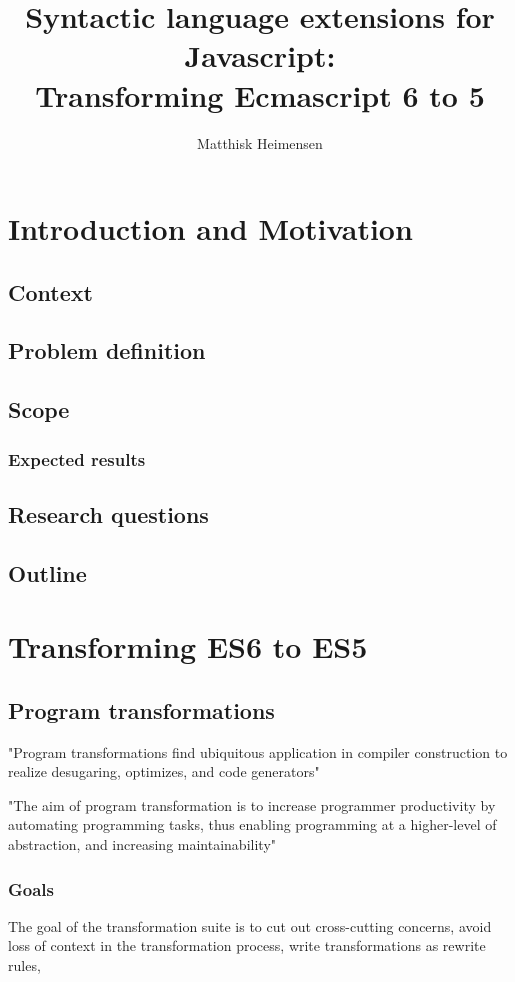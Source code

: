\documentclass[10pt,a4paper]{article}
\title{%
	Syntactic language extensions for Javascript: \\
	\large Transforming Ecmascript 6 to 5}
\author{Matthisk Heimensen}
\begin{document}
	\maketitle
	\tableofcontents

\chapter{Introduction and Motivation}

\section{Context}
\section{Problem definition}
\section{Scope}
\subsection{Expected results}
\section{Research questions}
\section{Outline}

\chapter{Transforming ES6 to ES5}

\section{Program transformations}
"Program transformations find ubiquitous application in compiler construction to realize desugaring, optimizes, and code generators"\cite{Erdweg2014} 

"The aim of program transformation is to increase programmer productivity by automating programming tasks, thus enabling programming at a higher-level of abstraction, and increasing maintainability"\cite{Visser2001}

\subsection{Goals}
The goal of the transformation suite is to cut out cross-cutting concerns, avoid loss of context in the transformation process, write transformations as rewrite rules, 
\end{document}
